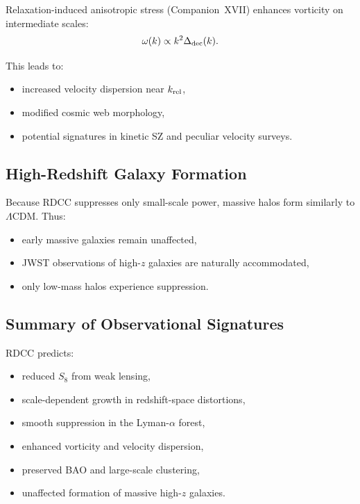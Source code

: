 \documentclass[11pt,a4paper]{article}
\begin{document}
Relaxation-induced anisotropic stress (Companion~XVII) enhances vorticity on
intermediate scales:
\begin{equation}
\omega(k) \propto k^2 \Delta_{\rm dec}(k).
\end{equation}

This leads to:
\begin{itemize}
\item increased velocity dispersion near $k_{\rm rel}$,
\item modified cosmic web morphology,
\item potential signatures in kinetic SZ and peculiar velocity surveys.
\end{itemize}

\subsection{High-Redshift Galaxy Formation}

Because RDCC suppresses only small-scale power, massive halos form similarly to
$\Lambda$CDM. Thus:
\begin{itemize}
\item early massive galaxies remain unaffected,
\item JWST observations of high-$z$ galaxies are naturally accommodated,
\item only low-mass halos experience suppression.
\end{itemize}

\subsection{Summary of Observational Signatures}

RDCC predicts:
\begin{itemize}
\item reduced $S_8$ from weak lensing,
\item scale-dependent growth in redshift-space distortions,
\item smooth suppression in the Lyman-$\alpha$ forest,
\item enhanced vorticity and velocity dispersion,
\item preserved BAO and large-scale clustering,
\item unaffected formation of massive high-$z$ galaxies.
\end{itemize}
\end{document}
